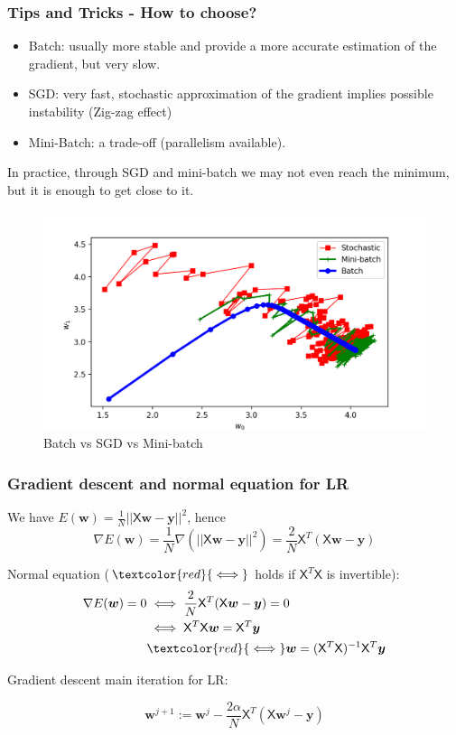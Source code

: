 \documentclass{beamer}
\begin{document}
	\begin{frame}
		\frametitle{Tips and Tricks - How to choose?}
		\begin{itemize}
			\item Batch: usually more stable and provide a more accurate estimation of the gradient, but very slow.
			\item SGD: very fast, stochastic approximation of the gradient implies possible instability (Zig-zag effect)
			\item Mini-Batch: a trade-off (parallelism available).
		\end{itemize}
	In practice, through SGD and mini-batch we may not even reach the minimum, but it is enough to get close to it.
		\begin{figure}
			\centering
			\includegraphics[scale=0.35]{images/gd_mb_sgd}
			\caption{Batch vs SGD vs Mini-batch}
		\end{figure}
	
	\end{frame}

	\begin{frame}
		\frametitle{Gradient descent and normal equation for LR}
		We have $E(\bm{w}) = \frac{1}{N} ||\mathsf{X}\bm{w} - \bm{y}||^2$, hence
		\begin{equation*}
			\nabla E(\bm{w}) = \frac{1}{N} \nabla (||\mathsf{X}\bm{w} - \bm{y}||^2) = \frac{2}{N}\mathsf{X}^T(\mathsf{X}\bm{w} - \bm{y})
		\end{equation*}
	
	Normal equation ($\textcolor{red}{\iff}$ holds if $\mathsf{X}^T\mathsf{X}$ is invertible):
	\begin{align*}
		\nabla E(\bm{w}) = 0 &\iff \frac{2}{N}\mathsf{X}^T(\mathsf{X}\bm{w} - \bm{y}) = 0\\ 
		&\iff \mathsf{X}^T\mathsf{X}\bm{w} = \mathsf{X}^T\bm{y}\\
		& \textcolor{red}{\iff} \bm{w} = (\mathsf{X}^T\mathsf{X})^{-1}\mathsf{X}^T\bm{y}
	\end{align*}
	
	Gradient descent main iteration for LR:
	
	\begin{equation*}
		\bm{w}^{j+1} := \bm{w}^{j} - \frac{2\alpha}{N}\mathsf{X}^T(\mathsf{X}\bm{w}^j - \bm{y})
	\end{equation*}
	
		
	\end{frame}
\end{document}
